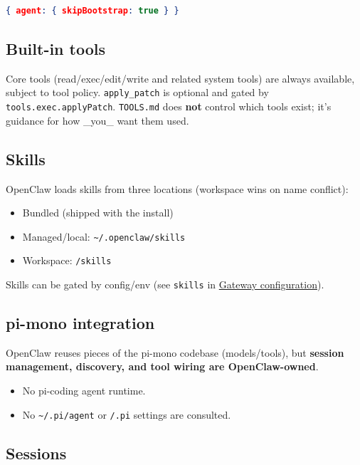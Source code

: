 \begin{lstlisting}[language=json]
{ agent: { skipBootstrap: true } }
\end{lstlisting}


\subsection{Built-in tools}


Core tools (read/exec/edit/write and related system tools) are always available,
subject to tool policy. \texttt{apply\_patch} is optional and gated by
\texttt{tools.exec.applyPatch}. \texttt{TOOLS.md} does \textbf{not} control which tools exist; it’s
guidance for how \_you\_ want them used.

\subsection{Skills}


OpenClaw loads skills from three locations (workspace wins on name conflict):

\begin{itemize}
  \item Bundled (shipped with the install)
  \item Managed/local: \texttt{\textasciitilde{}/.openclaw/skills}
  \item Workspace: \texttt{/skills}
\end{itemize}


Skills can be gated by config/env (see \texttt{skills} in \href{/gateway/configuration}{Gateway configuration}).

\subsection{pi-mono integration}


OpenClaw reuses pieces of the pi-mono codebase (models/tools), but \textbf{session management, discovery, and tool wiring are OpenClaw-owned}.

\begin{itemize}
  \item No pi-coding agent runtime.
  \item No \texttt{\textasciitilde{}/.pi/agent} or \texttt{/.pi} settings are consulted.
\end{itemize}


\subsection{Sessions}


